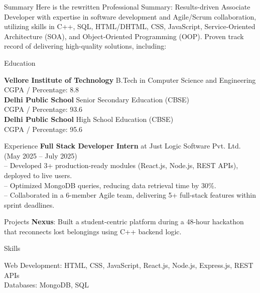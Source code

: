 \documentclass{resume}
\begin{document}
    \begin{rSection}{Summary}
    Here is the rewritten Professional Summary: Results-driven Associate Developer with expertise in software development and Agile/Scrum collaboration, utilizing skills in C++, SQL, HTML/DHTML, CSS, JavaScript, Service-Oriented Architecture (SOA), and Object-Oriented Programming (OOP). Proven track record of delivering high-quality solutions, including:
    \end{rSection}

    \begin{rSection}{Education}
    
    \textbf{ Vellore Institute of Technology } \hfill B.Tech in Computer Science and Engineering\\
    CGPA / Percentage: 8.8\\[6pt]
    
    \textbf{ Delhi Public School } \hfill Senior Secondary Education (CBSE)\\
    CGPA / Percentage: 93.6\\[6pt]
    
    \textbf{ Delhi Public School } \hfill High School Education (CBSE)\\
    CGPA / Percentage: 95.6\\[6pt]
    
    \end{rSection}

    \begin{rSection}{Experience}
    \textbf{Full Stack Developer Intern} at Just Logic Software Pvt. Ltd. \hfill (May 2025 -- July 2025)\\
-- Developed 3+ production-ready modules (React.js, Node.js, REST APIs), deployed to live users.\\
-- Optimized MongoDB queries, reducing data retrieval time by 30\%.\\
-- Collaborated in a 6-member Agile team, delivering 5+ full-stack features within sprint deadlines.

    \end{rSection}

    \begin{rSection}{Projects}
    \textbf{Nexus}: Built a student-centric platform during a 48-hour hackathon that reconnects lost belongings using C++ backend logic.
    \end{rSection}

    \begin{rSection}{Skills}
    
    Web Development: HTML, CSS, JavaScript, React.js, Node.js, Express.js, REST APIs\\
    
    Databases: MongoDB, SQL\\
    
    \end{rSection}
\end{document}
